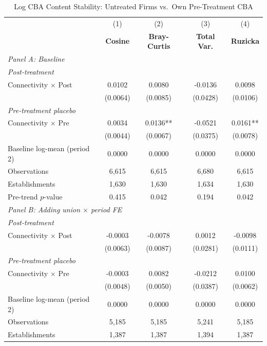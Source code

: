 \begin{table}[H]
\centering
\caption{Log CBA Content Stability: Untreated Firms vs.\ Own Pre-Treatment CBA}
\label{tab:self_ln_cba_similarity}
\scriptsize
\setlength{\tabcolsep}{8pt}
\begin{tabular}{lcccc}
\hline\hline
 & (1) & (2) & (3) & (4) \\
 & \textbf{Cosine} & \textbf{Bray-Curtis} & \textbf{Total Var.} & \textbf{Ruzicka} \\
\hline
\multicolumn{5}{l}{\textit{Panel A: Baseline}} \\
\multicolumn{5}{l}{\textit{Post-treatment}} \\
Connectivity $\times$ Post & 0.0102 & 0.0080 & -0.0136 & 0.0098 \\
 & (0.0064) & (0.0085) & (0.0428) & (0.0106) \\
\multicolumn{5}{l}{\textit{Pre-treatment placebo}} \\
Connectivity $\times$ Pre & 0.0034 & 0.0136** & -0.0521 & 0.0161** \\
 & (0.0044) & (0.0067) & (0.0375) & (0.0078) \\
\hline
Baseline log-mean (period 2) & 0.0000 & 0.0000 & 0.0000 & 0.0000 \\
Observations &        6,615 &        6,615 &        6,680 &        6,615 \\
Establishments &        1,630 &        1,630 &        1,634 &        1,630 \\
Pre-trend $p$-value & 0.415 & 0.042 & 0.194 & 0.042 \\
\hline
\multicolumn{5}{l}{\textit{Panel B: Adding union $\times$ period FE}} \\
\multicolumn{5}{l}{\textit{Post-treatment}} \\
Connectivity $\times$ Post & -0.0003 & -0.0078 & 0.0012 & -0.0098 \\
 & (0.0063) & (0.0087) & (0.0281) & (0.0111) \\
\multicolumn{5}{l}{\textit{Pre-treatment placebo}} \\
Connectivity $\times$ Pre & -0.0003 & 0.0082 & -0.0212 & 0.0100 \\
 & (0.0048) & (0.0050) & (0.0387) & (0.0062) \\
\hline
Baseline log-mean (period 2) & 0.0000 & 0.0000 & 0.0000 & 0.0000 \\
Observations &        5,185 &        5,185 &        5,241 &        5,185 \\
Establishments &        1,387 &        1,387 &        1,394 &        1,387 \\

\end{tabular}
\end{table}
